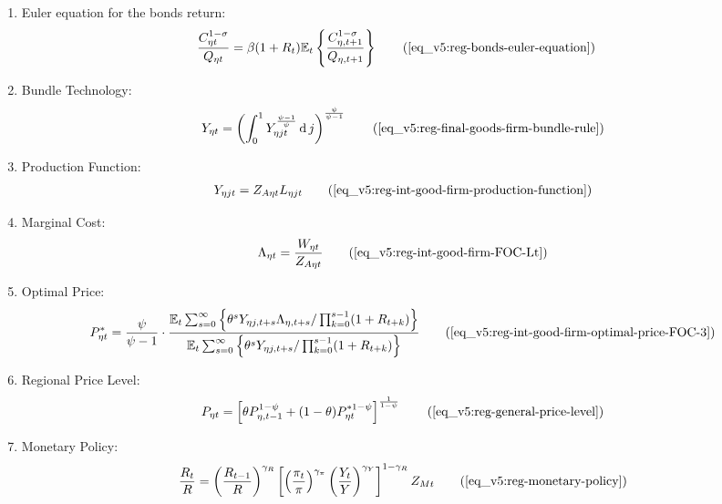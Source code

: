 \documentclass[../thesis.tex]{subfiles}
\begin{document}
{\begin{itemize}
\begin{enumerate}
		\item Euler equation for the bonds return:
		\begin{align}
			\frac{ C_{\eta t}^{1-\sigma}}{Q_{\eta t}} &= \beta (1 + R_{t}) \E \left\{ \frac{ C_{\eta, t+1}^{1-\sigma}}{Q_{\eta, t+1}} \right\} \tag{\ref{eq_v5:reg-bonds-euler-equation}}
		\end{align}
		
		\item Bundle Technology:
		\begin{align}
			Y_{\eta t} = \left( \int_{0}^{1} Y_{\eta jt}^{\frac{\psi-1}{\psi}} \dif j \right)^{\frac{\psi}{\psi-1}} \tag{\ref{eq_v5:reg-final-goods-firm-bundle-rule}}
		\end{align}
		
		\item Production Function:
		\begin{align}
			Y_{\eta jt} = Z_{A\eta t} L_{\eta jt} \tag{\ref{eq_v5:reg-int-good-firm-production-function}}
		\end{align}

		\item Marginal Cost:
		\begin{align}
			\Lambda_{\eta t} = \frac{W_{\eta t}}{Z_{A\eta t}} \tag{\ref{eq_v5:reg-int-good-firm-FOC-Lt}}
		\end{align}

		\item Optimal Price:
		\begin{align}
			P_{\eta t}^{\ast} = \frac{\psi}{\psi-1} \cdot \frac{ \E \sum_{s=0}^{\infty} \left\{ \theta^s Y_{\eta j,t+s} \Lambda_{\eta, t+s} / \prod_{k=0}^{s-1}(1+R_{t+k}) \right\}} {\E \sum_{s=0}^{\infty} \left\{ \theta^s Y_{\eta j,t+s} / \prod_{k=0}^{s-1}(1 + R_{t+k}) \right\}} \tag{\ref{eq_v5:reg-int-good-firm-optimal-price-FOC-3}}
		\end{align}
		
		\item Regional Price Level:
		\begin{align}
			P_{\eta t} = \left[ \theta P_{\eta,t-1}^{1-\psi} + (1-\theta) P_{\eta t}^{\ast 1-\psi} \right]^\frac{1}{1-\psi} \tag{\ref{eq_v5:reg-general-price-level}}
		\end{align}
		
		\item Monetary Policy:
		\begin{align}
			\frac{R_{t}}{R} = \left( \frac{R_{t-1}}{R} \right)^{\gamma_R} \left[ \left( \frac{\pi_t}{\pi} \right)^{\gamma_\pi} \left( \frac{Y_{t}}{Y} \right)^{\gamma_Y} \right]^{1-\gamma_R} Z_{Mt} \tag{\ref{eq_v5:reg-monetary-policy}}
		\end{align}
		

\end{enumerate}
\end{itemize}}
\end{document}
